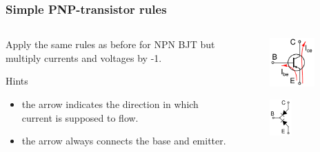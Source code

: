 \documentclass[beamer]{standalone}
\begin{document}
\begin{frame}
\frametitle{Simple PNP-transistor rules}
\begin{columns}[t]
	\begin{column}{.65\textwidth}
		Apply the same rules as before for NPN BJT but multiply currents and voltages by
		-1.

		Hints 
		\begin{itemize}
			\item 
				the arrow indicates the direction in which current is supposed to
				flow.
			\item 
				the arrow always connects the base and emitter.
		\end{itemize}
	\end{column}
	\begin{column}{.25\textwidth}
		\begin{figure}
			\includegraphics[width=0.80\textwidth]{./schematics/pnp_transistor_with_currents.pdf}
		\end{figure}
		\begin{figure}
			\includegraphics[width=0.40\textwidth]{./schematics/pnp_diodes.pdf}
		\end{figure}
	\end{column}
\end{columns}
\end{frame}
\end{document}
